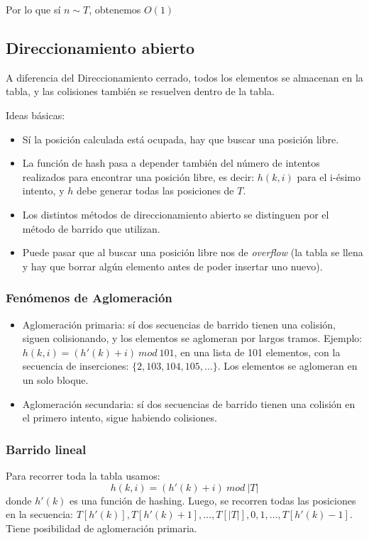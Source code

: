 Por lo que sí $n \sim T$, obtenemos $O(1)$

\subsection{Direccionamiento abierto}
A diferencia del Direccionamiento cerrado, todos los elementos se almacenan en la tabla, y las colisiones tambi\'en se resuelven dentro de la tabla.

Ideas b\'asicas:
\begin{itemize}
\item S\'i la posici\'on calculada est\'a ocupada, hay que buscar una posici\'on libre.
\item La funci\'on de hash pasa a depender tambi\'en del n\'umero de intentos realizados para encontrar una posici\'on libre, es decir: $h(k,i)$ para el i-\'esimo intento, y $h$ debe generar todas las posiciones de $T$.
\item Los distintos m\'etodos de direccionamiento abierto se distinguen por el m\'etodo de barrido que utilizan.
\item Puede pasar que al buscar una posici\'on libre nos de \textit{overflow} (la tabla se llena y hay que borrar alg\'un elemento antes de poder insertar uno nuevo).
\end{itemize}

\subsubsection{Fen\'omenos de Aglomeraci\'on}
\begin{itemize}
\item Aglomeraci\'on primaria: s\'i dos secuencias de barrido tienen una colisi\'on, siguen colisionando, y los elementos se aglomeran por largos tramos.
Ejemplo: $h(k,i) = (h'(k) + i)\ mod\ 101$, en una lista de 101 elementos, con la secuencia de inserciones: $\{2, 103, 104, 105,\dots\}$. Los elementos se aglomeran en un solo bloque.
\item Aglomeraci\'on secundaria: s\'i dos secuencias de barrido tienen una colisi\'on en el primero intento, sigue habiendo colisiones.
\end{itemize}

\subsubsection{Barrido lineal}
Para recorrer toda la tabla usamos:
$$h(k,i) = (h'(k) + i)\ mod\ |T|$$
donde $h'(k)$ es una funci\'on de hashing. Luego, se recorren todas las posiciones en la secuencia: $T[h'(k)], T[h'(k) + 1], \dots, T[|T|], 0, 1, \dots, T[h'(k) - 1]$. Tiene posibilidad de aglomeraci\'on primaria.
